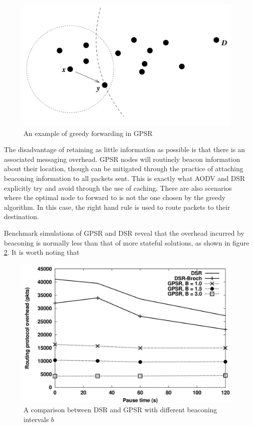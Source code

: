 \begin{figure}
	\centering	
	\includegraphics[scale=0.7]{img/gpsr2}
	\caption{An example of greedy forwarding in GPSR\cite{karp2000gpsr}}
	\label{gpsr1}
\end{figure}

The disadvantage of retaining as little information as possible is that there is an associated messaging overhead. GPSR nodes will routinely beacon information about their location, though can be mitigated through the practice of attaching beaconing information to all packets sent. This is exactly what AODV and DSR explicitly try and avoid through the use of caching. There are also scenarios where the optimal node to forward to is not the one chosen by the greedy algorithm. In this case, the right hand rule is used to route packets to their destination.

Benchmark simulations of GPSR and DSR reveal that the overhead incurred by beaconing is normally less than that of more stateful solutions, as shown in figure \ref{gpsr2}. It is worth noting that 

\begin{figure}
	\centering	
	\includegraphics[scale=0.7]{img/gpsr}
	\caption{A comparison between DSR and GPSR with different beaconing intervals $b$\cite{karp2000gpsr}}
	\label{gpsr2}
\end{figure}	
	
